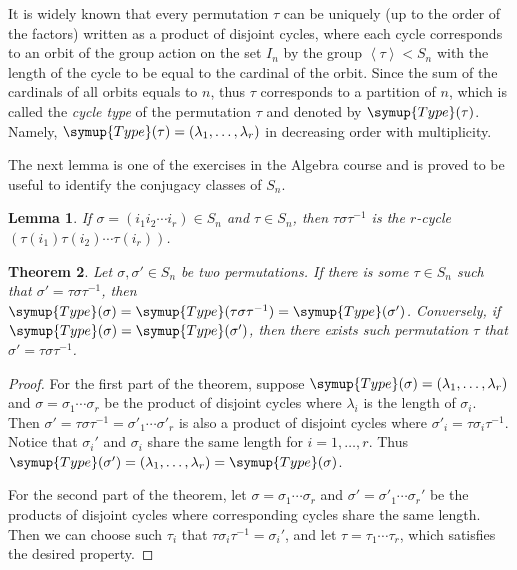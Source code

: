 \documentclass{assignment}[2019/10/15]
\newcommand{\lr}[3]{\left#1#3\right#2}
\theoremstyle{plain}
\newtheorem{theorem}{Theorem}[section]
\newtheorem{lemma}[theorem]{Lemma}
\newcommand{\Type}{\mathop{}\!\symup{Type}}
\numberwithin{equation}{section}
\begin{document}
    It is widely known that every permutation $\tau$ can be uniquely (up to the order of the factors) written as a product of disjoint cycles, where each cycle corresponds to an orbit of the group action on the set $I_n$ by the group $\lr<>\tau < S_n$ with the length of the cycle to be equal to the cardinal of the orbit. Since the sum of the cardinals of all orbits equals to $n$, thus $\tau$ corresponds to a partition of $n$, which is called the \emph{cycle type} of the permutation $\tau$ and denoted by $\Type(\tau)$. Namely, $\Type(\tau)=(\lambda_1, \dotsc, \lambda_r)$ in decreasing order with multiplicity.

    The next lemma is one of the exercises in the Algebra course and is proved to be useful to identify the conjugacy classes of $S_n$.

    \begin{lemma}
        If $\sigma = (i_1 i_2 \dotsb i_r)\in S_n$ and $\tau\in S_n$, then $\tau\sigma\tau^{-1}$ is the $r$-cycle $\left(\tau(i_1) \tau(i_2) \dotsb \tau(i_r)\right)$.
    \end{lemma}

    \begin{theorem}
        Let $\sigma, \sigma'\in S_n$ be two permutations. If there is some $\tau\in S_n$ such that $\sigma'=\tau\sigma\tau^{-1}$, then $\Type(\sigma)=\Type(\tau\sigma\tau^{-1}) = \Type(\sigma')$. Conversely, if $\Type(\sigma) = \Type(\sigma')$, then there exists such permutation $\tau$ that $\sigma' = \tau\sigma\tau^{-1}$.
    \end{theorem}

    \begin{proof}
        For the first part of the theorem, suppose $\Type(\sigma) = (\lambda_1, \dotsc, \lambda_r)$ and $\sigma=\sigma_1\dotsb\sigma_r$ be the product of disjoint cycles where $\lambda_i$ is the length of $\sigma_i$. Then $\sigma' = \tau\sigma\tau^{-1} = \sigma'_1\dotsb \sigma'_r$ is also a product of disjoint cycles where $\sigma'_i = \tau\sigma_i\tau^{-1}$. Notice that $\sigma_i'$ and $\sigma_i$ share the same length for $i= 1, \dotsc, r$. Thus $\Type(\sigma') = (\lambda_1, \dotsc, \lambda_r) = \Type(\sigma)$.

        For the second part of the theorem, let $\sigma=\sigma_1\dotsb\sigma_r$ and $\sigma'=\sigma'_1\dotsb\sigma_r'$ be the products of disjoint cycles where corresponding cycles share the same length. Then we can choose such $\tau_i$ that $\tau\sigma_i\tau^{-1}=\sigma_i'$, and let $\tau = \tau_1\dotsb\tau_r$, which satisfies the desired property.
    \end{proof}
\end{document}
